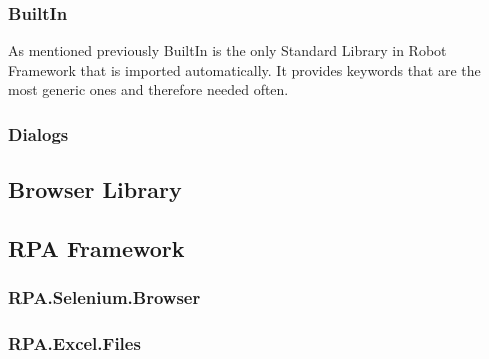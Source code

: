 \subsubsection{BuiltIn}
As mentioned previously BuiltIn is the only Standard Library in Robot Framework that is imported automatically. It provides keywords that are the most generic ones and therefore needed often.
\subsubsection{Dialogs}
\subsection{Browser Library}
\subsection{RPA Framework}
\subsubsection{RPA.Selenium.Browser}
\subsubsection{RPA.Excel.Files}

\cite{robot-framework:standard-library}
\clearpage %
